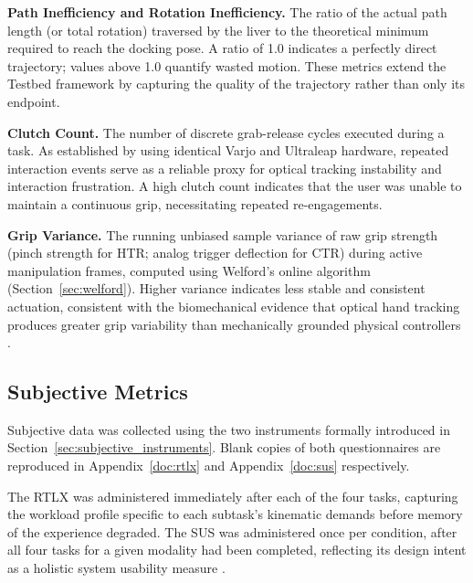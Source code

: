 \textbf{Path Inefficiency and Rotation Inefficiency.} The ratio of the actual path length (or total rotation) traversed by the liver to the theoretical minimum required to reach the docking pose. A ratio of 1.0 indicates a perfectly direct trajectory; values above 1.0 quantify wasted motion. These metrics extend the Testbed framework \citep{Bowman2001TestbedTechniques} by capturing the quality of the trajectory rather than only its endpoint.

\textbf{Clutch Count.} The number of discrete grab-release cycles executed during a task. As established by \citet{Rantamaa2023ComparisonReality} using identical Varjo and Ultraleap hardware, repeated interaction events serve as a reliable proxy for optical tracking instability and interaction frustration. A high clutch count indicates that the user was unable to maintain a continuous grip, necessitating repeated re-engagements.

\textbf{Grip Variance.} The running unbiased sample variance of raw grip strength (pinch strength for HTR; analog trigger deflection for CTR) during active manipulation frames, computed using Welford's online algorithm (Section~\ref{sec:welford}). Higher variance indicates less stable and consistent actuation, consistent with the biomechanical evidence that optical hand tracking produces greater grip variability than mechanically grounded physical controllers \citep{Allgaier2022ATraining}.


\subsection{Subjective Metrics}
\label{sec:subjective_metrics}

Subjective data was collected using the two instruments formally introduced in Section~\ref{sec:subjective_instruments}. Blank copies of both questionnaires are reproduced in Appendix~\ref{doc:rtlx} and Appendix~\ref{doc:sus} respectively.

The RTLX was administered immediately after each of the four tasks, capturing the workload profile specific to each subtask's kinematic demands before memory of the experience degraded. The SUS was administered once per condition, after all four tasks for a given modality had been completed, reflecting its design intent as a holistic system usability measure \citep{Brooke1996SUS:Scale}.

